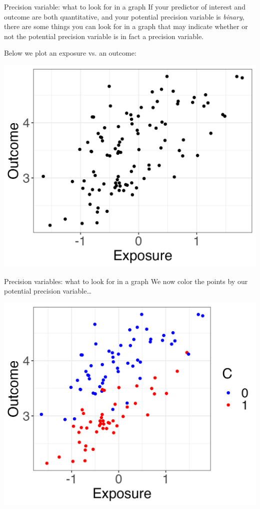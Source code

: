 \documentclass[10pt,t]{beamer}
\begin{document}
\begin{frame}{Precision variable: what to look for in a graph}
If your predictor of interest and outcome are both quantitative, and your potential precision variable is \textit{binary}, there are some things you can look for in a graph that may indicate whether or not the potential precision variable is in fact a precision variable. \pause

\vspace{0.3cm}

Below we plot an exposure vs. an outcome:

\vspace{0.1cm}

\centering \includegraphics[scale=0.4]{p5.png}
\end{frame}

\begin{frame}{Precision variables: what to look for in a graph}
We now color the points by our potential precision variable\dots

\vspace{0.3cm}

\centering \includegraphics[scale=0.4]{p6.png}

\end{frame}
\end{document}
